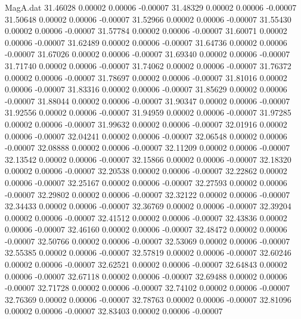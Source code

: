 \begin{filecontents}{MagA.dat}
  31.46028    0.00002    0.00006   -0.00007
  31.48329    0.00002    0.00006   -0.00007
  31.50648    0.00002    0.00006   -0.00007
  31.52966    0.00002    0.00006   -0.00007
  31.55430    0.00002    0.00006   -0.00007
  31.57784    0.00002    0.00006   -0.00007
  31.60071    0.00002    0.00006   -0.00007
  31.62489    0.00002    0.00006   -0.00007
  31.64736    0.00002    0.00006   -0.00007
  31.67026    0.00002    0.00006   -0.00007
  31.69340    0.00002    0.00006   -0.00007
  31.71740    0.00002    0.00006   -0.00007
  31.74062    0.00002    0.00006   -0.00007
  31.76372    0.00002    0.00006   -0.00007
  31.78697    0.00002    0.00006   -0.00007
  31.81016    0.00002    0.00006   -0.00007
  31.83316    0.00002    0.00006   -0.00007
  31.85629    0.00002    0.00006   -0.00007
  31.88044    0.00002    0.00006   -0.00007
  31.90347    0.00002    0.00006   -0.00007
  31.92556    0.00002    0.00006   -0.00007
  31.94959    0.00002    0.00006   -0.00007
  31.97285    0.00002    0.00006   -0.00007
  31.99632    0.00002    0.00006   -0.00007
  32.01916    0.00002    0.00006   -0.00007
  32.04241    0.00002    0.00006   -0.00007
  32.06548    0.00002    0.00006   -0.00007
  32.08888    0.00002    0.00006   -0.00007
  32.11209    0.00002    0.00006   -0.00007
  32.13542    0.00002    0.00006   -0.00007
  32.15866    0.00002    0.00006   -0.00007
  32.18320    0.00002    0.00006   -0.00007
  32.20538    0.00002    0.00006   -0.00007
  32.22862    0.00002    0.00006   -0.00007
  32.25167    0.00002    0.00006   -0.00007
  32.27593    0.00002    0.00006   -0.00007
  32.29802    0.00002    0.00006   -0.00007
  32.32122    0.00002    0.00006   -0.00007
  32.34433    0.00002    0.00006   -0.00007
  32.36769    0.00002    0.00006   -0.00007
  32.39204    0.00002    0.00006   -0.00007
  32.41512    0.00002    0.00006   -0.00007
  32.43836    0.00002    0.00006   -0.00007
  32.46160    0.00002    0.00006   -0.00007
  32.48472    0.00002    0.00006   -0.00007
  32.50766    0.00002    0.00006   -0.00007
  32.53069    0.00002    0.00006   -0.00007
  32.55385    0.00002    0.00006   -0.00007
  32.57819    0.00002    0.00006   -0.00007
  32.60246    0.00002    0.00006   -0.00007
  32.62521    0.00002    0.00006   -0.00007
  32.64843    0.00002    0.00006   -0.00007
  32.67118    0.00002    0.00006   -0.00007
  32.69488    0.00002    0.00006   -0.00007
  32.71728    0.00002    0.00006   -0.00007
  32.74102    0.00002    0.00006   -0.00007
  32.76369    0.00002    0.00006   -0.00007
  32.78763    0.00002    0.00006   -0.00007
  32.81096    0.00002    0.00006   -0.00007
  32.83403    0.00002    0.00006   -0.00007

\end{filecontents}
